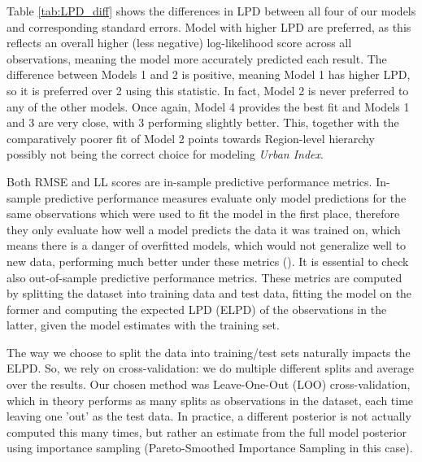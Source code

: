 \documentclass[12pt]{article}
\begin{document}
Table \ref{tab:LPD_diff} shows the differences in LPD between all four of our models and corresponding standard errors.
Model with higher LPD are preferred, as this reflects an overall higher (less negative) log-likelihood score across all observations, meaning the model more accurately predicted each result.
The difference between Models 1 and 2 is positive, meaning Model 1 has higher LPD, so it is preferred over 2 using this statistic. In fact, Model 2 is never preferred to any of the other models. Once again, Model 4 provides the best fit and Models 1 and 3 are very close, with 3 performing slightly better. This, together with the comparatively poorer fit of Model 2 points towards Region-level hierarchy possibly not being the correct choice for modeling \textit{Urban Index}.



Both RMSE and LL scores are in-sample predictive performance metrics. In-sample predictive performance measures evaluate only model predictions for the same observations which were used to fit the model in the first place, therefore they only evaluate how well a model predicts the data it was trained on, which means there is a danger of overfitted models, which would not generalize well to new data, performing much better under these metrics (\cite{brmsbook}).
It is essential to check also out-of-sample predictive performance metrics. These metrics are computed by splitting the dataset into training data and test data, fitting the model on the former and computing the expected LPD (ELPD) of the observations in the latter, given the model estimates with the training set. 

The way we choose to split the data into training/test sets naturally impacts the ELPD. So, we rely on cross-validation: we do multiple different splits and average over the results. Our chosen method was Leave-One-Out (LOO) cross-validation, which in theory performs as many splits as observations in the dataset, each time leaving one 'out' as the test data. In practice, a different posterior is not actually computed this many times, but rather an estimate from the full model posterior using importance sampling (Pareto-Smoothed Importance Sampling in this case).
\end{document}
